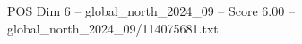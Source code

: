 \begin{textsample}{POS Dim 6 – global\_north\_2024\_09 – Score 6.00 – global\_north\_2024\_09/114075681.txt}
\end{textsample}
